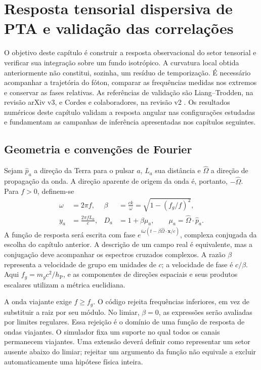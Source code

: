 \chapter[Resposta de PTA]{Resposta tensorial dispersiva de PTA e validação das correlações}
\label{chap:resposta-pta}

O objetivo deste capítulo é construir a resposta observacional do setor
tensorial e verificar sua integração sobre um fundo isotrópico. A
curvatura local obtida anteriormente não constitui, sozinha, um resíduo
de temporização. É necessário acompanhar a trajetória do fóton,
comparar as frequências medidas nos extremos e conservar as fases
relativas. As referências de validação são Liang--Trodden, na revisão
arXiv v3, e Cordes e colaboradores, na revisão v2
\autocite{liang2021,cordes2025}. Os resultados numéricos deste capítulo
validam a resposta angular nas configurações estudadas e fundamentam
as campanhas de inferência apresentadas nos capítulos seguintes.

\section{Geometria e convenções de Fourier}

Sejam \(\hat p_a\) a direção da Terra para o pulsar \(a\),
\(L_a\) sua distância e \(\hat\Omega\) a direção de propagação
da onda. A direção aparente de origem da onda é, portanto,
\(-\hat\Omega\). Para \(f>0\), definem-se
\begin{equation}
 \begin{aligned}
 \omega&=2\pi f,&
 \beta&=\frac{ck}{\omega}=\sqrt{1-(f_g/f)^2},\\
 y_a&=\frac{2\pi fL_a}{c},&
 D_a&=1+\beta\mu_a,
 \qquad\mu_a=\hat\Omega\cdot\hat p_a.
 \end{aligned}
 \label{eq:pta-geometria}
\end{equation}
A função de resposta será escrita com fase
\(e^{i\omega(t-\beta\hat\Omega\cdot\mathbf x/c)}\), complexa
conjugada da escolha do capítulo anterior. A descrição de um campo
real é equivalente, mas a conjugação deve acompanhar os espectros
cruzados complexos. A razão \(\beta\) representa a velocidade de
grupo em unidades de \(c\); a velocidade de fase é \(c/\beta\).
Aqui \(f_g=m_gc^2/h_{\mathrm P}\), e as componentes de direções
espaciais e seus produtos escalares utilizam a métrica euclidiana.

A onda viajante exige \(f\geq f_g\). O código rejeita frequências
inferiores, em vez de substituir a raiz por seu módulo. No limiar,
\(\beta=0\), as expressões serão avaliadas por limites regulares.
Essa rejeição é o domínio de uma função de resposta de ondas
viajantes. O simulador fixa um suporte no qual todos os canais
permanecem viajantes. Uma extensão deverá definir como representar um setor ausente abaixo do limiar; rejeitar um argumento
da função não equivale a excluir automaticamente uma hipótese física
inteira.


